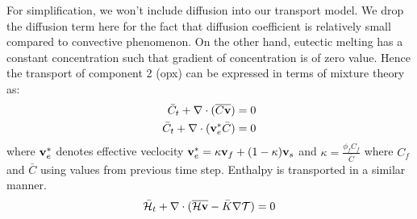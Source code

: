 For simplification, we won't include diffusion into our transport model.
We drop the diffusion term here for the fact that diffusion coefficient is
relatively small compared to convective phenomenon. On the other hand, 
eutectic melting has a constant concentration such that gradient of 
concentration is of zero value. Hence the transport of component 2 (opx) 
can be expressed in terms of mixture theory as:
\begin{equation}
		  \begin{aligned}
					 \bar{C}_t + \nabla \cdot (\overline{C\bold{v}}) &= 0\\
					 \bar{C}_t + \nabla \cdot (\bold{v}_e^* \bar{C}) &= 0
		  \end{aligned}
\end{equation}
where $\bold{v}_e^*$ denotes effective veclocity 
$\bold{v}_e^* = \kappa \bold{v}_f + (1-\kappa)\bold{v}_s$
and $\kappa = \frac{\phi_f C_f}{\bar{C}}$ where $C_f$ and $\bar{C}$ using 
values from previous time step.
Enthalpy is transported in a similar manner.
\begin{equation}
		  \bar{\mathcal{H}}_t + \nabla \cdot (\overline{\mathcal{H}\bold{v}} - 
		  \bar{K}\nabla \mathcal{T})  = 0
\end{equation}

